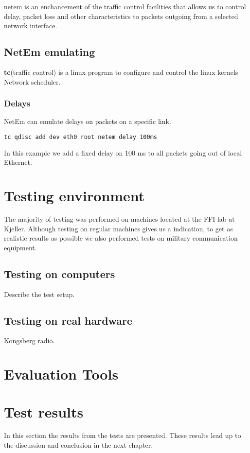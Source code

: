 
\gls{netem} is an enchancement of the traffic control facilities that allows us
to control delay, packet loss and other characteristics to packets outgoing from
a selected network interface.

\subsection{NetEm emulating}

\textbf{tc}(traffic control) is a linux program to configure and control the
linux kernels Network scheduler.

\subsubsection{Delays}

NetEm can emulate delays on packets on a specific link.

\begin{lstlisting}[frame=single, caption="Emulating delay"]
  tc qdisc add dev eth0 root netem delay 100ms
\end{lstlisting}

In this example we add a fixed delay on 100 ms to all packets going out of local
Ethernet.

\section{Testing environment}

The majority of testing was performed on machines located at the FFI-lab at
Kjeller. Although testing on regular machines gives us a indication, to get as
realistic results as possible we also performed tests on military communication
equipment.

\subsection{Testing on computers}
Describe the test setup.

\subsection{Testing on real hardware}
Kongsberg radio.


\section{Evaluation Tools}

\section{Test results}

In this section the results from the tests are presented. These results lead up to the discussion and conclusion in the next chapter.
